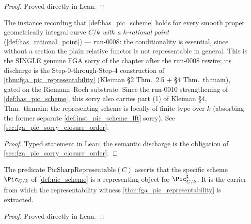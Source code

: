 \begin{proof}
  Proved directly in Lean.
\end{proof}

\begin{definition}
  \label{def:inst_has_pic_scheme}
  The instance recording that \cref{def:has_pic_scheme} holds for every
  smooth proper geometrically integral curve \(C/k\) \emph{with a
  \(k\)-rational point} (\cref{def:has_rational_point}) --- run-0008: the
  conditionality is essential, since without a section the plain relative
  functor is not representable in general. This is the SINGLE genuine FGA
  sorry of the chapter after the run-0008 rewire; its discharge is the
  Step-0-through-Step-4 construction of \cref{thm:fga_pic_representability}
  (Kleiman \S 2 Thm.~2.5 + \S 4 Thm.~th:main), gated on the Riemann--Roch
  substrate. Since the run-0010 strengthening of
  \cref{def:has_pic_scheme}, this sorry also carries part (1) of Kleiman
  \S 4, Thm.~th:main: the representing scheme is locally of finite type
  over \(k\) (absorbing the former separate
  \cref{def:inst_pic_scheme_lft} sorry). See
  \cref{sec:fga_pic_sorry_closure_order}.
\end{definition}

\begin{proof}

\leanok
  Typed statement in Lean; the semantic discharge is the obligation of
  \cref{sec:fga_pic_sorry_closure_order}.
\end{proof}

\begin{definition}
  \label{def:pic_sharp_representable}
  The predicate \(\mathrm{PicSharpRepresentable}(C)\) asserts that the specific scheme
  \(\Pic_{C/k}\) of \cref{def:pic_scheme} is a representing object for
  \(\Pic^\sharp_{C/k}\). It is the carrier from which the representability
  witness \cref{thm:fga_pic_representability} is extracted.
\end{definition}

\begin{proof}
  Proved directly in Lean.
\end{proof}

